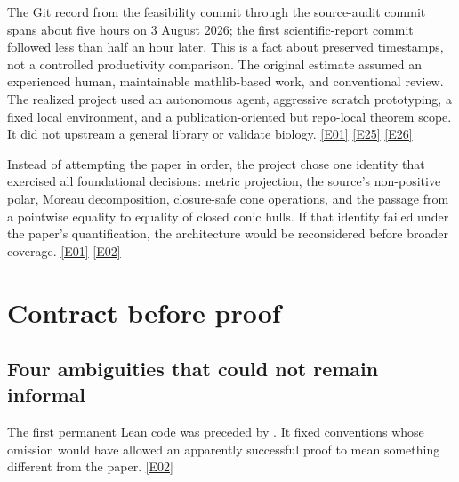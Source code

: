 \documentclass[11pt,a4paper]{article}
\newcommand{\artifact}[1]{\texttt{\detokenize{#1}}}
\newcommand{\ev}[1]{%
  \hyperref[ev:#1]{\textcolor{ReportBlue}{\textsf{\scriptsize[#1]}}}}
\begin{document}
The Git record from the feasibility commit through the source-audit commit spans
about five hours on 3 August 2026; the first scientific-report commit followed less
than half an hour later. This is a fact about preserved timestamps, not a controlled
productivity comparison. The original estimate assumed an experienced human,
maintainable mathlib-based work, and conventional review. The realized project used
an autonomous agent, aggressive scratch prototyping, a fixed local environment, and
a publication-oriented but repo-local theorem scope. It did not upstream a general
library or validate biology. \ev{E01}\ev{E25}\ev{E26}

\begin{turningpoint}
Instead of attempting the paper in order, the project chose one identity that
exercised all foundational decisions: metric projection, the source's non-positive
polar, Moreau decomposition, closure-safe cone operations, and the passage from a
pointwise equality to equality of closed conic hulls. If that identity failed under
the paper's quantification, the architecture would be reconsidered before broader
coverage. \ev{E01}\ev{E02}
\end{turningpoint}

\section{Contract before proof}
\label{sec:contract}

\subsection{Four ambiguities that could not remain informal}

The first permanent Lean code was preceded by
\artifact{FORMALIZATION-SPEC.md}. It fixed conventions whose omission would have
allowed an apparently successful proof to mean something different from the paper.
\ev{E02}
\end{document}
